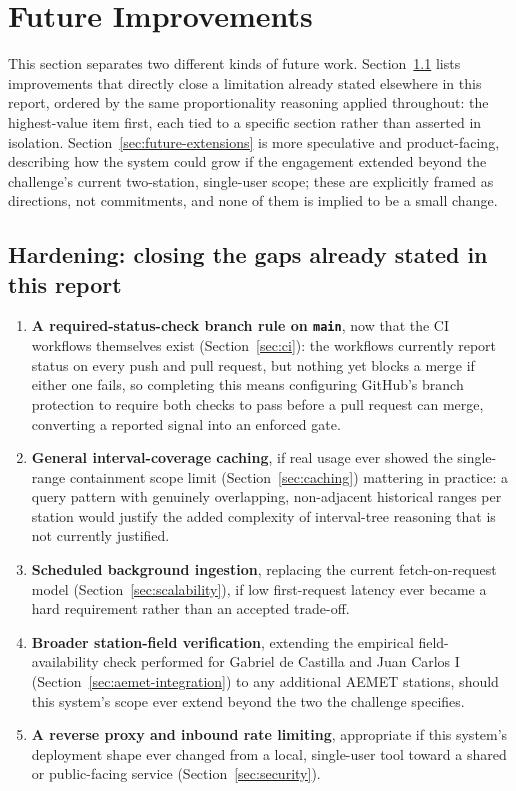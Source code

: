 \documentclass[11pt,a4paper]{article}
\begin{document}
\section{Future Improvements}
\label{sec:future}

This section separates two different kinds of future work. Section~\ref{sec:future-hardening}
lists improvements that directly close a limitation already stated
elsewhere in this report, ordered by the same proportionality reasoning
applied throughout: the highest-value item first, each tied to a specific
section rather than asserted in isolation. Section~\ref{sec:future-extensions}
is more speculative and product-facing, describing how the system could
grow if the engagement extended beyond the challenge's current two-station,
single-user scope; these are explicitly framed as directions, not
commitments, and none of them is implied to be a small change.

\subsection{Hardening: closing the gaps already stated in this report}
\label{sec:future-hardening}

\begin{enumerate}[nosep]
    \item \textbf{A required-status-check branch rule on \texttt{main}},
    now that the CI workflows themselves exist (Section~\ref{sec:ci}):
    the workflows currently report status on every push and pull request,
    but nothing yet blocks a merge if either one fails, so completing this
    means configuring GitHub's branch protection to require both checks
    to pass before a pull request can merge, converting a reported signal
    into an enforced gate.
    \item \textbf{General interval-coverage caching}, if real usage ever
    showed the single-range containment scope limit
    (Section~\ref{sec:caching}) mattering in practice: a query pattern
    with genuinely overlapping, non-adjacent historical ranges per
    station would justify the added complexity of interval-tree
    reasoning that is not currently justified.
    \item \textbf{Scheduled background ingestion}, replacing the current
    fetch-on-request model (Section~\ref{sec:scalability}), if low
    first-request latency ever became a hard requirement rather than an
    accepted trade-off.
    \item \textbf{Broader station-field verification}, extending the
    empirical field-availability check performed for Gabriel de Castilla
    and Juan Carlos I (Section~\ref{sec:aemet-integration}) to any
    additional AEMET stations, should this system's scope ever extend
    beyond the two the challenge specifies.
    \item \textbf{A reverse proxy and inbound rate limiting}, appropriate
    if this system's deployment shape ever changed from a local,
    single-user tool toward a shared or public-facing service
    (Section~\ref{sec:security}).
\end{enumerate}
\end{document}
